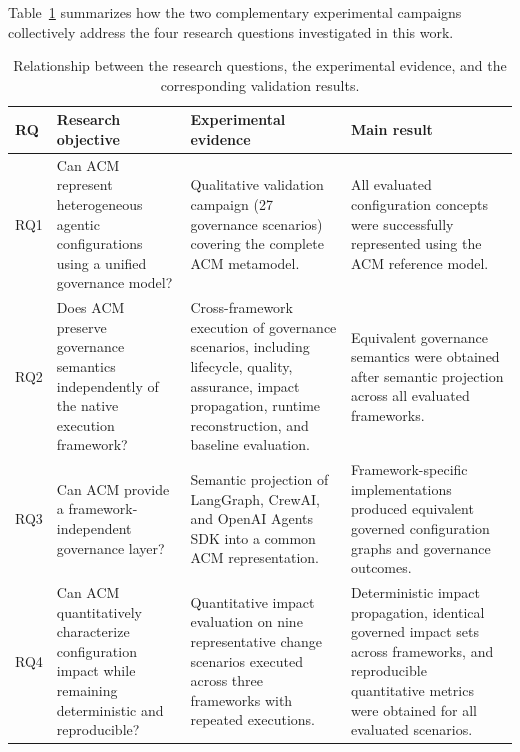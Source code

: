\documentclass[10pt]{article}
\begin{document}
Table~\ref{tab:rq_validation} summarizes how the two complementary experimental campaigns collectively address the four research questions investigated in this work.
\begin{table}[t]
	\caption{Relationship between the research questions, the experimental evidence, and the corresponding validation results.}
	\label{tab:rq_validation}
	\centering
	\footnotesize
	\begin{tabular}{p{1.0cm}p{4.0cm}p{4.2cm}p{3.0cm}}
		\toprule
		\textbf{RQ} &
		\textbf{Research objective} &
		\textbf{Experimental evidence} &
		\textbf{Main result} \\
		\midrule
		
		RQ1 &
		Can ACM represent heterogeneous agentic configurations using a unified governance model?
		&
		Qualitative validation campaign (27 governance scenarios) covering the complete ACM metamodel.
		&
		All evaluated configuration concepts were successfully represented using the ACM reference model.
		\\
		
		RQ2 &
		Does ACM preserve governance semantics independently of the native execution framework?
		&
		Cross-framework execution of governance scenarios, including lifecycle, quality, assurance, impact propagation, runtime reconstruction, and baseline evaluation.
		&
		Equivalent governance semantics were obtained after semantic projection across all evaluated frameworks.
		\\
		
		RQ3 &
		Can ACM provide a framework-independent governance layer?
		&
		Semantic projection of LangGraph, CrewAI, and OpenAI Agents SDK into a common ACM representation.
		&
		Framework-specific implementations produced equivalent governed configuration graphs and governance outcomes.
		\\
		
		RQ4 &
		Can ACM quantitatively characterize configuration impact while remaining deterministic and reproducible?
		&
		Quantitative impact evaluation on nine representative change scenarios executed across three frameworks with repeated executions.
		&
		Deterministic impact propagation, identical governed impact sets across frameworks, and reproducible quantitative metrics were obtained for all evaluated scenarios.
		\\
		
		\bottomrule
	\end{tabular}
\end{table}
\end{document}
